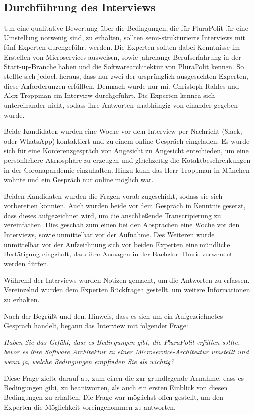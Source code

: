 \subsection{Durchführung des Interviews}

Um eine qualitative Bewertung über die Bedingungen, die für PluraPolit für eine Umstellung notwenig sind, zu erhalten, sollten semi-strukturierte Interviews mit fünf Experten durchgeführt werden. Die Experten sollten dabei Kenntnisse im Erstellen von Microservices ausweisen, sowie jahrelange Berufserfahrung in der Start-up-Branche haben und die Softwarearchitektur von PluraPolit kennen. So stellte sich jedoch heraus, dass nur zwei der ursprünglich ausgesuchten Experten, diese Anforderungen erfüllten. Demnach wurde nur mit Christoph Rahles und Alex Troppman ein Interview durchgeführt. Die Experten kennen sich untereinander nicht, sodass ihre Antworten unabhängig von einander gegeben wurde.

Beide Kandidaten wurden eine Woche vor dem Interview per Nachricht (Slack, oder WhatsApp) kontaktiert und zu einem online Gespräch eingeladen. Es wurde sich für eine Konferenzgespräch von Angesicht zu Angesicht entschieden, um eine persönlichere Atmosphäre zu erzeugen und gleichzeitig die Kotaktbeschrenkungen in der Coronapandemie einzuhalten. Hinzu kann das Herr Troppman in München wohnte und ein Gespräch nur online möglich war.

Beiden Kandidaten wurden die Fragen vorab zugeschickt, sodass sie sich vorbereiten konnten. Auch wurden beide vor dem Gespräch in Kenntnis gesetzt, dass dieses aufgezeichnet wird, um die anschließende Transcripierung zu vereinfachen. Dies geschah zum einen bei den Absprachen eine Woche vor den Interviews, sowie unmittelbar vor der Aufnahme. Des Weiteren wurde unmittelbar vor der Aufzeichnung sich vor beiden Experten eine mündliche Bestätigung eingeholt, dass ihre Aussagen in der Bachelor Thesis verwendet werden dürfen.

Während der Interviews wurden Notizen gemacht, um die Antworten zu erfassen. Vereinzelnd wurden dem Experten Rückfragen gestellt, um weitere Informationen zu erhalten.

Nach der Begrüßt und dem Hinweis, dass es sich um ein Aufgezeichnetes Gespräch handelt, begann das Interview mit folgender Frage: 

\textit{Haben Sie das Gefühl, dass es Bedingungen gibt, die PluraPolit erfüllen sollte, bevor es ihre Software Architektur zu einer Microservice-Architektur umstellt und wenn ja, welche Bedingungen empfinden Sie als wichtig?}

Diese Frage zielte darauf ab, zum einen die zur grundlegende Annahme, dass es Bedingungen gibt, zu beantworten, als auch ein ersten Einblick von diesen Bedingungen zu erhalten. Die Frage war möglichst offen gestellt, um den Experten die Möglichkeit voreingenommen zu antworten.

